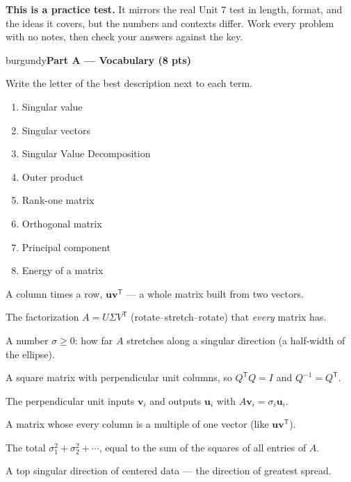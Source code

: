 \documentclass[10pt]{article}
\newcommand{\vv}{\mathbf{v}}
\newcommand{\uu}{\mathbf{u}}
\newcommand{\T}{^{\mathsf T}}
\newcommand{\parthead}[1]{%
  \vspace{6pt}\noindent
  \begin{headlinebox}{burgundy}{\color{white}\bfseries #1}\end{headlinebox}%
  \vspace{4pt}}
\begin{document}
\namedateperiod

\vspace{0.10in}
\begin{remindbox}
\small
\textbf{This is a practice test.} It mirrors the real Unit 7 test in length, format,
and the ideas it covers, but the numbers and contexts differ. Work every problem
with no notes, then check your answers against the key.
\end{remindbox}

\parthead{Part A --- Vocabulary (8 pts)}
Write the letter of the best description next to each term.

\vspace{4pt}
\noindent
\begin{minipage}[t]{0.40\textwidth}
\begin{enumerate}[leftmargin=2.2em, itemsep=7pt, label=\arabic*.]
  \item Singular value 
  \item Singular vectors 
  \item Singular Value Decomposition 
  \item Outer product 
  \item Rank-one matrix 
  \item Orthogonal matrix 
  \item Principal component 
  \item Energy of a matrix 
\end{enumerate}
\end{minipage}%
\hfill
\begin{minipage}[t]{0.57\textwidth}
\small
\begin{description}[leftmargin=1.4em, itemsep=3pt]
  \item[(A)] A column times a row, $\uu\vv\T$ --- a whole matrix built from two vectors.
  \item[(B)] The factorization $A=U\Sigma V\T$ (rotate--stretch--rotate) that \emph{every} matrix has.
  \item[(C)] A number $\sigma\ge0$: how far $A$ stretches along a singular direction (a half-width of the ellipse).
  \item[(D)] A square matrix with perpendicular unit columns, so $Q\T Q=I$ and $Q^{-1}=Q\T$.
  \item[(E)] The perpendicular unit inputs $\vv_i$ and outputs $\uu_i$ with $A\vv_i=\sigma_i\uu_i$.
  \item[(F)] A matrix whose every column is a multiple of one vector (like $\uu\vv\T$).
  \item[(G)] The total $\sigma_1^2+\sigma_2^2+\cdots$, equal to the sum of the squares of all entries of $A$.
  \item[(H)] A top singular direction of centered data --- the direction of greatest spread.
\end{description}
\end{minipage}
\end{document}
